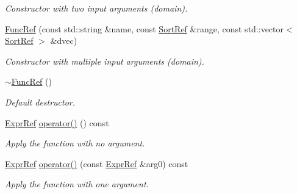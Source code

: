 \begin{DoxyCompactItemize}
\begin{DoxyCompactList}\small\item\em Constructor with two input arguments (domain). \end{DoxyCompactList}\item 
\mbox{\label{classilang_1_1_func_ref_a5c61813457c137da44cd172020359aa1}} 
\mbox{\hyperlink{classilang_1_1_func_ref_a5c61813457c137da44cd172020359aa1}{Func\+Ref}} (const std\+::string \&name, const \mbox{\hyperlink{classilang_1_1_sort_ref}{Sort\+Ref}} \&range, const std\+::vector$<$ \mbox{\hyperlink{classilang_1_1_sort_ref}{Sort\+Ref}} $>$ \&dvec)
\begin{DoxyCompactList}\small\item\em Constructor with multiple input arguments (domain). \end{DoxyCompactList}\item 
\mbox{\label{classilang_1_1_func_ref_a4d34e1f750bf8f3258428b96acd20cb7}} 
\mbox{\hyperlink{classilang_1_1_func_ref_a4d34e1f750bf8f3258428b96acd20cb7}{$\sim$\+Func\+Ref}} ()
\begin{DoxyCompactList}\small\item\em Default destructor. \end{DoxyCompactList}\item 
\mbox{\label{classilang_1_1_func_ref_a5e700f9e77621146734bce510fa05354}} 
\mbox{\hyperlink{classilang_1_1_expr_ref}{Expr\+Ref}} \mbox{\hyperlink{classilang_1_1_func_ref_a5e700f9e77621146734bce510fa05354}{operator()}} () const
\begin{DoxyCompactList}\small\item\em Apply the function with no argument. \end{DoxyCompactList}\item 
\mbox{\label{classilang_1_1_func_ref_aba202e79630f81f2c0222da72b79594b}} 
\mbox{\hyperlink{classilang_1_1_expr_ref}{Expr\+Ref}} \mbox{\hyperlink{classilang_1_1_func_ref_aba202e79630f81f2c0222da72b79594b}{operator()}} (const \mbox{\hyperlink{classilang_1_1_expr_ref}{Expr\+Ref}} \&arg0) const
\begin{DoxyCompactList}\small\item\em Apply the function with one argument. \end{DoxyCompactList}\item 

\end{DoxyCompactItemize}
